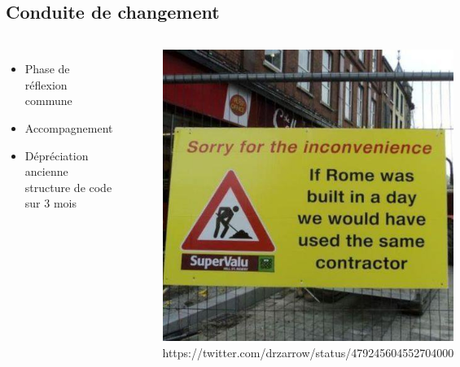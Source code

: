 \subsection{Conduite de changement}
\begin{frame}{\subsecname}
	\begin{columns}[onlytextwidth]
		\begin{itemize}
			\item Phase de réflexion commune
			\item Accompagnement
			\item Dépréciation ancienne structure de code sur 3 mois
		\end{itemize}
		\begin{figure}
			\includegraphics[width=0.6\linewidth]{img/rome.jpg}
			\captionsetup{labelformat=empty}
			\caption{https://twitter.com/drzarrow/status/479245604552704000}
			\label{fig:rome}
		\end{figure}
	\end{columns}
\end{frame}
